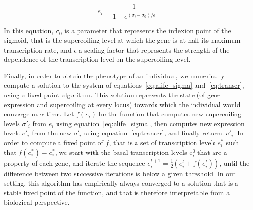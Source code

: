 \begin{equation}
  e_i = \frac{1}{1 + e^{(\sigma_i - \sigma_0)/\epsilon}}
  \label{eq:transcr}
\end{equation}

In this equation, $\sigma_0$ is a parameter that represents the inflexion point of the sigmoid, that is the supercoiling level at which the gene is at half its maximum transcription rate, and $\epsilon$ a scaling factor that represents the strength of the dependence of the transcription level on the supercoiling level.

Finally, in order to obtain the phenotype of an individual, we numerically compute a solution to the system of equations~\ref{eq:alife_sigma} and~\ref{eq:transcr}, using a fixed point algorithm.
This solution represents the state (of gene expression and supercoiling at every locus) towards which the individual would converge over time.
Let $f(e_i)$ be the function that computes new supercoiling levels $\sigma'_i$ from $e_i$ using equation~\ref{eq:alife_sigma}, then computes new expression levels $e'_i$ from the new $\sigma'_i$ using equation~\ref{eq:transcr}, and finally returns $e'_i$.
In order to compute a fixed point of $f$, that is a set of transcription levels $e_i^*$ such that $f(e_i^*) = e_i^*$, we start with the basal transcription levels $e_i^0$ that are a property of each gene, and iterate the sequence $e_i^{t+1} = \frac{1}{2}(e_i^t + f(e_i^t))$, until the difference between two successive iterations is below a given threshold.
In our setting, this algorithm has empirically always converged to a solution that is a stable fixed point of the function, and that is therefore interpretable from a biological perspective.

